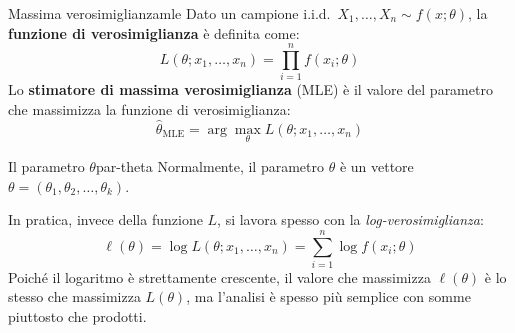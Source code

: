 \begin{definizione}{Massima verosimiglianza}{mle}
Dato un campione i.i.d.\ \( X_1, \dots, X_n \sim f(x; \theta) \), la \textbf{funzione di verosimiglianza} è definita come:
\[
L(\theta; x_1, \dots, x_n) = \prod_{i=1}^n f(x_i; \theta)
\]
Lo \textbf{stimatore di massima verosimiglianza} (MLE) è il valore del parametro che massimizza la funzione di verosimiglianza:
\[
\hat{\theta}_{\text{MLE}} = \arg\max_{\theta} L(\theta; x_1, \dots, x_n)
\]
\end{definizione}

\begin{nota}{Il parametro \( \theta \)}{par-theta}
    Normalmente, il parametro \( \theta \) è un vettore \( \theta = (\theta_1,
    \theta_2, \ldots, \theta_k) \).
\end{nota}

In pratica, invece della funzione \( L \), si lavora spesso con la \emph{log-verosimiglianza}:
\[
\ell(\theta) = \log L(\theta; x_1, \dots, x_n) = \sum_{i=1}^n \log f(x_i; \theta)
\]
Poiché il logaritmo è strettamente crescente, il valore che massimizza \( \ell(\theta) \) è lo stesso che massimizza \( L(\theta) \), ma l’analisi è spesso più semplice con somme piuttosto che prodotti.

